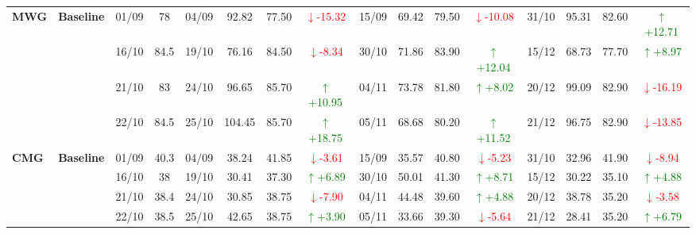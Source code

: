 {\begin{longtable}{llcc|cccc|cccc|cccc}
\multirow{4}{*}{\textbf{MWG}}
& \textbf{Baseline}
& 01/09 & 78 & 04/09 & 92.82 & 77.50 & \textcolor{red}{\(\downarrow\)-15.32} & 15/09 & 69.42 & 79.50 & \textcolor{red}{\(\downarrow\)-10.08} & 31/10 & 95.31 & 82.60 & \textcolor{green}{\(\uparrow\)+12.71} \\
& & 16/10 & 84.5 & 19/10 & 76.16 & 84.50 & \textcolor{red}{\(\downarrow\)-8.34} & 30/10 & 71.86 & 83.90 & \textcolor{green}{\(\uparrow\)+12.04} & 15/12 & 68.73 & 77.70 & \textcolor{green}{\(\uparrow\)+8.97} \\
& & 21/10 & 83 & 24/10 & 96.65 & 85.70 & \textcolor{green}{\(\uparrow\)+10.95} & 04/11 & 73.78 & 81.80 & \textcolor{green}{\(\uparrow\)+8.02} & 20/12 & 99.09 & 82.90 & \textcolor{red}{\(\downarrow\)-16.19} \\
& & 22/10 & 84.5 & 25/10 & 104.45 & 85.70 & \textcolor{green}{\(\uparrow\)+18.75} & 05/11 & 68.68 & 80.20 & \textcolor{green}{\(\uparrow\)+11.52} & 21/12 & 96.75 & 82.90 & \textcolor{red}{\(\downarrow\)-13.85} \\
\midrule

\multirow{4}{*}{\textbf{CMG}}
& \textbf{Baseline}
& 01/09 & 40.3 & 04/09 & 38.24 & 41.85 & \textcolor{red}{\(\downarrow\)-3.61} & 15/09 & 35.57 & 40.80 & \textcolor{red}{\(\downarrow\)-5.23} & 31/10 & 32.96 & 41.90 & \textcolor{red}{\(\downarrow\)-8.94} \\
& & 16/10 & 38 & 19/10 & 30.41 & 37.30 & \textcolor{green}{\(\uparrow\)+6.89} & 30/10 & 50.01 & 41.30 & \textcolor{green}{\(\uparrow\)+8.71} & 15/12 & 30.22 & 35.10 & \textcolor{green}{\(\uparrow\)+4.88} \\
& & 21/10 & 38.4 & 24/10 & 30.85 & 38.75 & \textcolor{red}{\(\downarrow\)-7.90} & 04/11 & 44.48 & 39.60 & \textcolor{green}{\(\uparrow\)+4.88} & 20/12 & 38.78 & 35.20 & \textcolor{red}{\(\downarrow\)-3.58} \\
& & 22/10 & 38.5 & 25/10 & 42.65 & 38.75 & \textcolor{green}{\(\uparrow\)+3.90} & 05/11 & 33.66 & 39.30 & \textcolor{red}{\(\downarrow\)-5.64} & 21/12 & 28.41 & 35.20 & \textcolor{green}{\(\uparrow\)+6.79} \\
\midrule


\end{longtable}}

